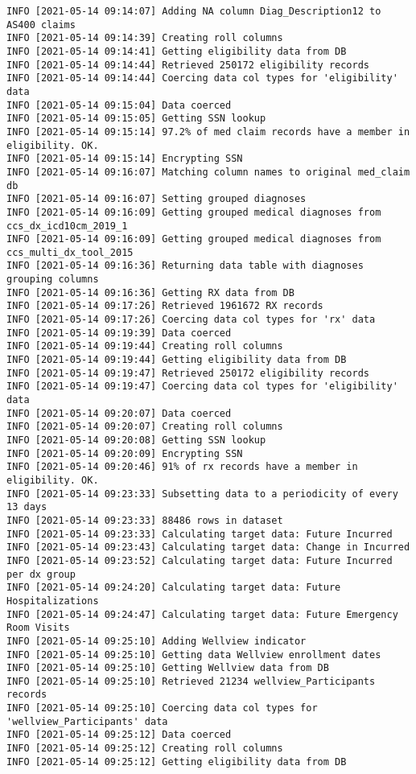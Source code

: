 \documentclass[
]{book}
\begin{document}
\begin{verbatim}
INFO [2021-05-14 09:14:07] Adding NA column Diag_Description12 to AS400 claims
INFO [2021-05-14 09:14:39] Creating roll columns
INFO [2021-05-14 09:14:41] Getting eligibility data from DB
INFO [2021-05-14 09:14:44] Retrieved 250172 eligibility records
INFO [2021-05-14 09:14:44] Coercing data col types for 'eligibility' data
INFO [2021-05-14 09:15:04] Data coerced
INFO [2021-05-14 09:15:05] Getting SSN lookup
INFO [2021-05-14 09:15:14] 97.2% of med claim records have a member in eligibility. OK.
INFO [2021-05-14 09:15:14] Encrypting SSN
INFO [2021-05-14 09:16:07] Matching column names to original med_claim db
INFO [2021-05-14 09:16:07] Setting grouped diagnoses
INFO [2021-05-14 09:16:09] Getting grouped medical diagnoses from ccs_dx_icd10cm_2019_1
INFO [2021-05-14 09:16:09] Getting grouped medical diagnoses from ccs_multi_dx_tool_2015
INFO [2021-05-14 09:16:36] Returning data table with diagnoses grouping columns
INFO [2021-05-14 09:16:36] Getting RX data from DB
INFO [2021-05-14 09:17:26] Retrieved 1961672 RX records
INFO [2021-05-14 09:17:26] Coercing data col types for 'rx' data
INFO [2021-05-14 09:19:39] Data coerced
INFO [2021-05-14 09:19:44] Creating roll columns
INFO [2021-05-14 09:19:44] Getting eligibility data from DB
INFO [2021-05-14 09:19:47] Retrieved 250172 eligibility records
INFO [2021-05-14 09:19:47] Coercing data col types for 'eligibility' data
INFO [2021-05-14 09:20:07] Data coerced
INFO [2021-05-14 09:20:07] Creating roll columns
INFO [2021-05-14 09:20:08] Getting SSN lookup
INFO [2021-05-14 09:20:09] Encrypting SSN
INFO [2021-05-14 09:20:46] 91% of rx records have a member in eligibility. OK.
INFO [2021-05-14 09:23:33] Subsetting data to a periodicity of every 13 days
INFO [2021-05-14 09:23:33] 88486 rows in dataset
INFO [2021-05-14 09:23:33] Calculating target data: Future Incurred
INFO [2021-05-14 09:23:43] Calculating target data: Change in Incurred
INFO [2021-05-14 09:23:52] Calculating target data: Future Incurred per dx group
INFO [2021-05-14 09:24:20] Calculating target data: Future Hospitalizations
INFO [2021-05-14 09:24:47] Calculating target data: Future Emergency Room Visits
INFO [2021-05-14 09:25:10] Adding Wellview indicator
INFO [2021-05-14 09:25:10] Getting data Wellview enrollment dates
INFO [2021-05-14 09:25:10] Getting Wellview data from DB
INFO [2021-05-14 09:25:10] Retrieved 21234 wellview_Participants records
INFO [2021-05-14 09:25:10] Coercing data col types for 'wellview_Participants' data
INFO [2021-05-14 09:25:12] Data coerced
INFO [2021-05-14 09:25:12] Creating roll columns
INFO [2021-05-14 09:25:12] Getting eligibility data from DB

\end{verbatim}
\end{document}
